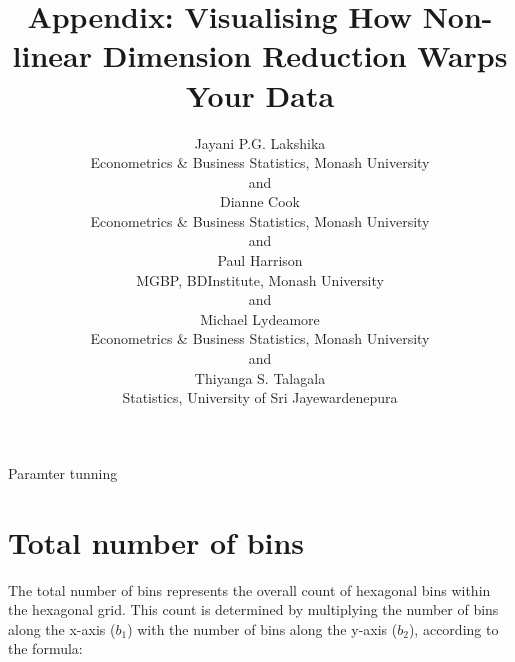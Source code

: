 \documentclass[
  12pt]{article}
\begin{document}
\def\spacingset#1{\renewcommand{\baselinestretch}%
{#1}\small\normalsize} \spacingset{1}


\title{\bf Appendix: Visualising How Non-linear Dimension Reduction
Warps Your Data}
\author{
Jayani P.G. Lakshika\\
Econometrics \& Business Statistics, Monash University\\
and\\Dianne Cook\\
Econometrics \& Business Statistics, Monash University\\
and\\Paul Harrison\\
MGBP, BDInstitute, Monash University\\
and\\Michael Lydeamore\\
Econometrics \& Business Statistics, Monash University\\
and\\Thiyanga S. Talagala\\
Statistics, University of Sri Jayewardenepura\\
}
\maketitle

\bigskip
\bigskip
\begin{abstract}

\end{abstract}


\newpage
\spacingset{1} %

\ifdefined\Shaded\renewenvironment{Shaded}{\begin{tcolorbox}[frame hidden, interior hidden, borderline west={3pt}{0pt}{shadecolor}, sharp corners, boxrule=0pt, breakable, enhanced]}{\end{tcolorbox}}\fi

Paramter tunning

\hypertarget{total-number-of-bins}{%
\section{Total number of bins}\label{total-number-of-bins}}

The total number of bins represents the overall count of hexagonal bins
within the hexagonal grid. This count is determined by multiplying the
number of bins along the x-axis (\(b_1\)) with the number of bins along
the y-axis (\(b_2\)), according to the formula:
\end{document}
